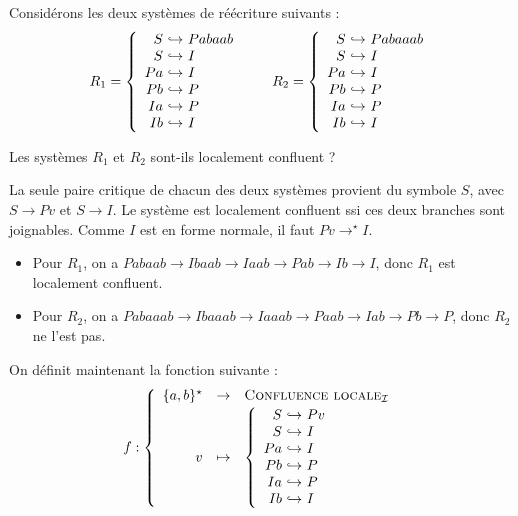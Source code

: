 \begin{exercice}
  Considérons les deux systèmes de réécriture suivants :
  $$
  R_1 =
  \left\{\begin{array}{r@{~\hookrightarrow~}l}
  S & Pabaab\\
  S & I     \\
  P a & I   \\
  P b & P   \\
  I a & P   \\
  I b & I
  \end{array}\right.
  \quad\quad
  R_2 =
  \left\{\begin{array}{r@{~\hookrightarrow~}l}
  S & Pabaaab\\
  S & I     \\
  P a & I   \\
  P b & P   \\
  I a & P   \\
  I b & I
  \end{array}\right.
  $$
  \begin{question}
  \item Les systèmes $R_1$ et $R_2$ sont-ils localement confluent ?
  \end{question}
  \begin{correction}
    La seule paire critique de chacun des deux systèmes provient du symbole $S$, avec
    $S \to Pv$ et  $S \to I$.
    Le système est localement confluent ssi ces deux branches sont joignables. Comme $I$ est en forme normale,
    il faut $Pv\to^\star I$.
    
    \begin{itemize}
    \item Pour $R_1$, on a $Pabaab \rightarrow Ibaab \rightarrow Iaab \rightarrow Pab \rightarrow Ib \rightarrow I$, donc $R_1$ est localement confluent.
    \item Pour $R_2$, on a $Pabaaab \rightarrow Ibaaab \rightarrow Iaaab \rightarrow Paab \rightarrow Iab \rightarrow Pb \rightarrow P$,
      donc $R_2$ ne l'est pas.
    \end{itemize}
  \end{correction}

  On définit maintenant la fonction suivante :
  $$
  f : \left\{
  \begin{array}{rcl}
    \{a,b\}^\star &\to& \textsc{Confluence locale}_{\mathcal{I}}\\[0.2em]
    v &\mapsto&
    \left\{
    \begin{array}{r@{~\hookrightarrow~}l}
      S & P v \\
      S & I   \\
      P a & I \\
      P b & P \\
      I a & P \\
      I b & I
    \end{array}
    \right.
  \end{array}\right.
  $$


\end{exercice}

